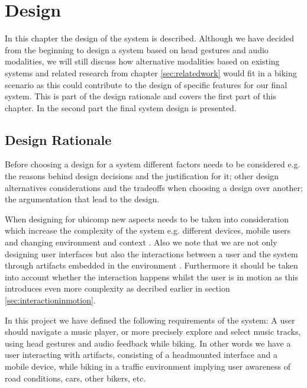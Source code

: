 \chapter{Design}
\label{sec:design}
In this chapter the design of the system is described. Although we have decided from the beginning to design a system based on head gestures and audio modalities, we will still discuss how alternative modalities based on existing systems and related research from chapter \ref{sec:relatedwork} would fit in a biking scenario as this could contribute to the design of specific features for our final system. This is part of the design rationale and covers the first part of this chapter. In the second part the final system design is presented.


\section{Design Rationale}


Before choosing a design for a system different factors needs to be considered e.g. the reasons behind design decisions and the justification for it; other design alternatives considerations and the tradeoffs when choosing a design over another; the argumentation that lead to the design.

When designing for ubicomp new aspects needs to be taken into consideration which increase the complexity of the system e.g. different devices, mobile users and changing environment and context \cite{barfield_fundamentals_2000}. Also we note that we are not only designing user interfaces but also the interactions between a user and the system through artifacts embedded in the environment \cite{beaudouin-lafon_designing_2004}. Furthermore it should be taken into account whether the interaction happens whilst the user is in motion as this introduces even more complexity as decribed earlier in section \ref{sec:interactioninmotion}.

In this project we have defined the following requirements of the system: A user should navigate a music player, or more precisely explore and select music tracks, using head gestures and audio feedback while biking. In other words we have a user interacting with artifacts, consisting of a headmounted interface and a mobile device, while biking in a traffic environment implying user awareness of road conditions, cars, other bikers, etc.

